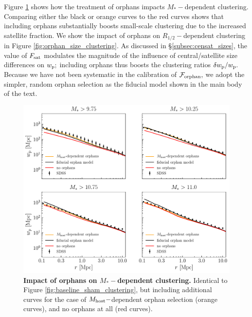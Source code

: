 \documentclass[usenatbib,usegraphicx,letterpaper]{mn2e}
\newcommand{\rhalf}{R_{1/2}}
\newcommand{\mstar}{M_{\ast}}
\newcommand{\fsat}{F_{\rm sat}}
\newcommand{\wproj}{w_{\rm p}}
\begin{document}
Figure \ref{fig:orphan_baseline_clustering} shows how the treatment of orphans impacts $\mstar-$dependent clustering. Comparing either the black or orange curves to the red curves shows that including orphans substantially boosts small-scale clustering due to the increased satellite fraction. We show the impact of orphans on $\rhalf-$dependent clustering in Figure \ref{fig:orphan_size_clustering}. As discussed in \S\ref{subsec:censat_sizes}, the value of $\fsat$ modulates the magnitude of the influence of central/satellite size differences on $\wproj;$ including orphans thus boosts the clustering ratios $\delta\wproj/\wproj.$ Because we have not been systematic in the calibration of $\mathcal{F}_{\rm orphan},$ we adopt the simpler, random orphan selection as the fiducial model shown in the main body of the text.



\begin{figure}
\centering
\includegraphics[width=12cm]{FIGS/baseline_sham_orphans.pdf}
\caption{
{\bf Impact of orphans on $\mstar-$dependent clustering.}  
Identical to Figure \ref{fig:baseline_sham_clustering}, but including additional curves for the case of $M_{\rm host}-$dependent orphan selection (orange curves), and no orphans at all (red curves). 
}
\label{fig:orphan_baseline_clustering}
\end{figure}
\end{document}
